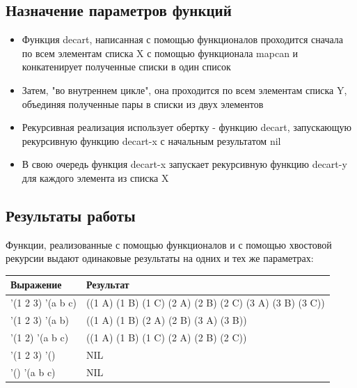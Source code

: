 \documentclass[a4paper,12pt]{article}
\begin{document}
	\newpage
 	
 	\subsection*{Назначение параметров функций}
 	
 	\begin{itemize}
 		\item Функция decart, написанная с помощью функционалов проходится сначала по всем элементам списка X с помощью функционала mapcan и конкатенирует полученные списки в один список
 		\item Затем, "во внутреннем цикле", она проходится по всем элементам списка Y, объединяя полученные пары в списки из двух элементов
 		\item Рекурсивная реализация использует обертку - функцию decart, запускающую рекурсивную функцию decart-x с начальным результатом nil
 		\item В свою очередь функция decart-x запускает рекурсивную функцию decart-y для каждого элемента из списка X
 	\end{itemize}
 	
 	\subsection*{Результаты работы}
 	
 	 	Функции, реализованные с помощью функционалов и с помощью хвостовой рекурсии выдают одинаковые результаты на одних и тех же параметрах:
 	
 	\begin{table} [h!]
 		\begin{center}
 			\begin{tabular}{|l|l|}
 				\hline
 				{\bf  Выражение} & {\bf Результат} \\
 				\hline
 				{'(1 2 3) '(a b c)} & ((1 A) (1 B) (1 C) (2 A) (2 B) (2 C) (3 A) (3 B) (3 C))\\
 				\hline
 				{'(1 2 3) '(a b)} & ((1 A) (1 B) (2 A) (2 B) (3 A) (3 B))\\
 				\hline
 				{'(1 2) '(a b c)} & ((1 A) (1 B) (1 C) (2 A) (2 B) (2 C))\\
 				\hline
 				{'(1 2 3) '()} & NIL\\
 				\hline
 				{'() '(a b c)} & NIL\\
 				\hline
 			\end{tabular}  
 			\label{m2}
 		\end{center}
 	\end{table}
 	
\end{document}
